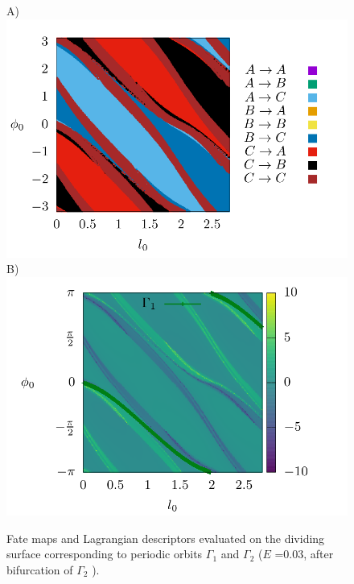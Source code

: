 \documentclass[10pt,aps,onecolumn,superscriptaddress]{revtex4-2}
\begin{document}
\begin{figure}[htbp]
	A)\includegraphics[scale=0.35]{fate_map_ds_gamma1E_003.png}
	B)\includegraphics[scale=0.35]{ld_action_ds_gamma1_E_003.png}
	\caption{ Fate maps and Lagrangian descriptors evaluated on the dividing surface corresponding to periodic orbits $\Gamma_1$ and $\Gamma_2$ ($E$ =0.03, after bifurcation of $\Gamma_2$  ). }
	\label{fig:ld_fm_ds}
\end{figure}
\end{document}
